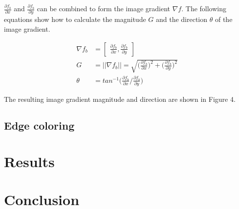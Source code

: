 \documentclass[runningheads]{llncs}
\begin{document}
$\frac{\partial f_b}{\partial x}$ and $\frac{\partial f_b}{\partial y}$ can be combined to form the image gradient $\nabla f$. The following equations show how to calculate the magnitude $G$ and the direction $\theta$ of the image gradient.

\begin{align}
\nabla f_b &= \begin{bmatrix} \frac{\partial f_b}{\partial x}, \frac{\partial f_b}{\partial y} \end{bmatrix} \\
G &= \vert \vert \nabla f_b \vert \vert = \sqrt{\Big( \frac{\partial f_b}{\partial x} \Big)^2 + \Big( \frac{\partial f_b}{\partial y} \Big)^2} \\
\theta &= tan^{-1} \Big(\frac{\partial f_b}{\partial x} / \frac{\partial f_b}{\partial y})
\end{align}

The resulting image gradient magnitude and direction are shown in Figure 4.

\subsection{Edge coloring}

\section{Results}

\section{Conclusion}




\end{document}
